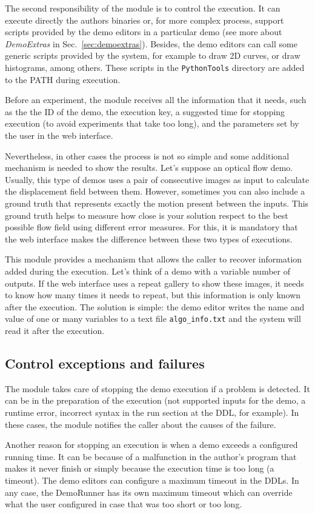 The second responsibility of the module is to control the execution.  It can execute directly the authors binaries or, for more complex process, support scripts provided by the demo editors in a particular demo (see more about \textit{DemoExtras} in Sec.~\ref{sec:demoextras}). Besides, the demo editors can call some generic scripts provided by the system, for example to draw 2D curves, or draw histograms, among others. These scripts in the {\tt PythonTools} directory are added to the PATH during execution.

Before an experiment, the module receives all the information that it needs, such as the the ID of the demo, the execution key, a suggested time for stopping execution (to avoid experiments that take too long), and the parameters set by the user in the web interface.

Nevertheless, in other cases the process is not so simple and some additional mechanism is needed to show the results.  Let's suppose an optical flow demo. Usually, this type of demos uses a pair of consecutive images as input to calculate the displacement field between them. However, sometimes you can also include a ground truth that represents exactly the motion present between the inputs. This ground truth helps to measure how close is your solution respect to the best possible flow field using different error measures. For this, it is mandatory that the web interface makes the difference between these two types of executions. 


This module provides a mechanism that allows the caller to recover information added during the execution. Let's think of a demo with a variable number of outputs. If the web interface uses a repeat gallery to show these images, it needs to know how many times it needs to repeat, but this information is only known after the execution. The solution is simple: the demo editor writes the name and value of one or many variables to a text file {\tt algo\_info.txt} and the system will read it after the execution.


\subsection{Control exceptions and failures}
\noindent

The module takes care of stopping the demo execution if a problem is detected. It can be in the preparation of the execution (not supported inputs for the demo, a runtime error, incorrect syntax in the run section at the DDL, for example). In these cases, the module notifies the caller about the causes of the failure.

Another reason for stopping an execution is when a demo exceeds a configured running time. It can be because of a malfunction in the author's program that makes it never finish or simply because the execution time is too long (a timeout). The demo editors can configure a maximum timeout in the DDLs. In any case, the DemoRunner has its own maximum timeout which can override what the user configured in case that was too short or too long.
